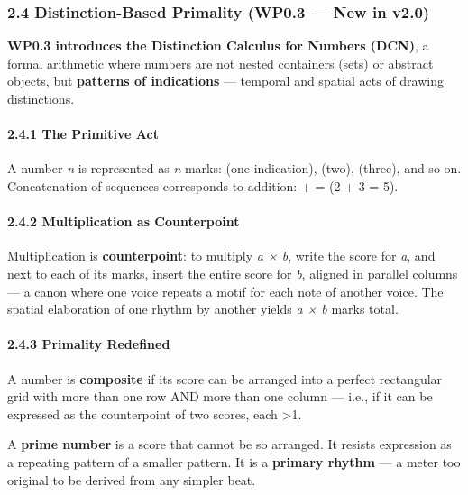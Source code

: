 \documentclass[
]{article}
\begin{document}
\subsubsection{2.4 Distinction-Based Primality (WP0.3 --- New in
v2.0)}\label{distinction-based-primality-wp0.3-new-in-v2.0}

\textbf{WP0.3 introduces the Distinction Calculus for Numbers (DCN)}, a
formal arithmetic where numbers are not nested containers (sets) or
abstract objects, but \textbf{patterns of indications} --- temporal and
spatial acts of drawing distinctions.

\paragraph{2.4.1 The Primitive Act}\label{the-primitive-act}

A number \emph{n} is represented as \emph{n} marks: \texttt{\textbar{}}
(one indication), \texttt{\textbar{}\textbar{}} (two),
\texttt{\textbar{}\textbar{}\textbar{}} (three), and so on.
Concatenation of sequences corresponds to addition:
\texttt{\textbar{}\textbar{}} + \texttt{\textbar{}\textbar{}\textbar{}}
= \texttt{\textbar{}\textbar{}\textbar{}\textbar{}\textbar{}} (2 + 3 =
5).

\paragraph{2.4.2 Multiplication as
Counterpoint}\label{multiplication-as-counterpoint}

Multiplication is \textbf{counterpoint}: to multiply \emph{a × b}, write
the score for \emph{a}, and next to each of its marks, insert the entire
score for \emph{b}, aligned in parallel columns --- a canon where one
voice repeats a motif for each note of another voice. The spatial
elaboration of one rhythm by another yields \emph{a × b} marks total.

\paragraph{2.4.3 Primality Redefined}\label{primality-redefined}

A number is \textbf{composite} if its score can be arranged into a
perfect rectangular grid with more than one row AND more than one column
--- i.e., if it can be expressed as the counterpoint of two scores, each
\textgreater1.

A \textbf{prime number} is a score that cannot be so arranged. It
resists expression as a repeating pattern of a smaller pattern. It is a
\textbf{primary rhythm} --- a meter too original to be derived from any
simpler beat.
\end{document}

